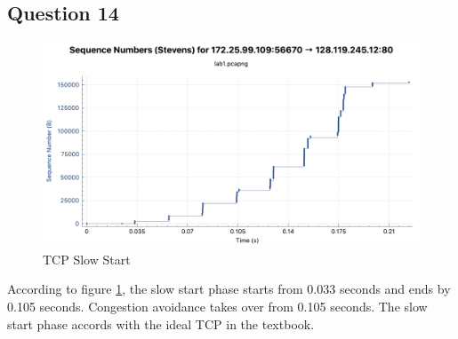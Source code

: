 \documentclass[titlepage, paper=a4, fontsize=11pt]{scrartcl} %
\numberwithin{equation}{section} %
\numberwithin{figure}{section} %
\numberwithin{table}{section} %
\begin{document}
\subsection*{Question 14}
\begin{figure}[!ht]
    \centering
    \includegraphics[width=\textwidth]{images/lab1-q14.pdf}
    \caption{TCP Slow Start}
    \label{fig:tcp-ss2}
\end{figure}
According to figure \ref{fig:tcp-ss2}, the slow start phase starts from 0.033 seconds and ends by 0.105 seconds. Congestion avoidance takes over from 0.105 seconds. The slow start phase accords with the ideal TCP in the textbook. \\
\end{document}
